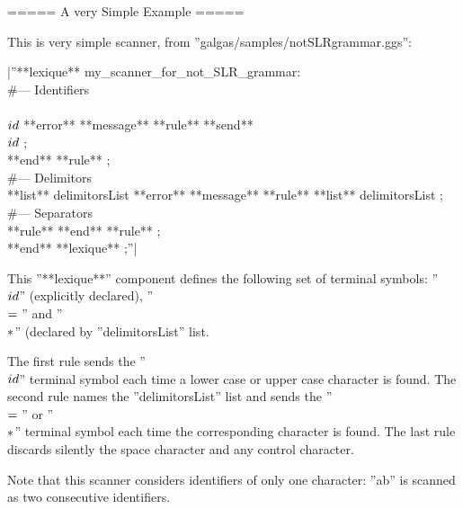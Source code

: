 {===== A very Simple Example =====

This is very simple scanner, from ''galgas/samples/notSLRgrammar.ggs'':

|''**lexique** my\_scanner\_for\_not\_SLR\_grammar:\\ 
\#--- Identifiers\\ 
\\$id\\$ **error** **message** %
**rule** %
 **send** \\$id\\$ ;\\ **end** **rule** ;\\ 
\#--- Delimitors\\ 
**list** delimitorsList **error** **message** %
**rule** **list** delimitorsList ;\\ 
\#--- Separators\\ 
**rule** %
**end** **rule** ;\\ 
**end** **lexique** ;''|

This ''**lexique**'' component defines the following set of terminal symbols: ''\\$id\\$'' (explicitly declared), ''\\$=\\$'' and ''\\$*\\$'' (declared  by ''delimitorsList'' list.

The first rule sends the ''\\$id\\$'' terminal symbol each time a lower case or upper case character is found. The second rule names the ''delimitorsList'' list and sends the ''\\$=\\$'' or ''\\$*\\$'' terminal symbol each time the corresponding character is found. The last rule discards silently the space character and any control character.

Note that this scanner considers identifiers of only one character: ''ab'' is scanned as two consecutive identifiers.

}
